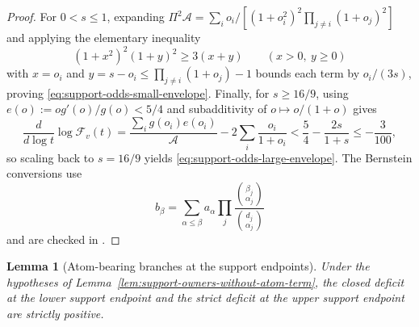 \documentclass[11pt]{article}
\numberwithin{equation}{section}
\newtheorem{lemma}[theorem]{Lemma}
\theoremstyle{definition}
\theoremstyle{remark}
\begin{document}
\begin{proof}
For $0<s\le1$, expanding $\Pi^2\mathcal A=\sum_i o_i/[(1+o_i^2)^2\prod_{j\ne i}(1+o_j)^2]$
and applying the elementary inequality
\begin{equation}
 (1+x^2)^2(1+y)^2\geq3(x+y)
 \qquad(x>0,\ y\geq0)
\label{eq:support-odds-termwise-denominator}
\end{equation}
with $x=o_i$ and $y=s-o_i\le\prod_{j\ne i}(1+o_j)-1$ bounds each term by
$o_i/(3s)$, proving \eqref{eq:support-odds-small-envelope}. Finally, for
$s\ge16/9$, using $e(o):=og'(o)/g(o)<5/4$ and subadditivity of $o\mapsto o/(1+o)$
gives
\[
 \frac{d}{d\log t}\log\mathcal F_v(t)
 =\frac{\sum_i g(o_i)e(o_i)}{\mathcal A}-2\sum_i\frac{o_i}{1+o_i}
 <\frac54-\frac{2s}{1+s}\leq-\frac3{100},
\]
so scaling back to $s=16/9$ yields \eqref{eq:support-odds-large-envelope}. The
Bernstein conversions use
\begin{equation}\label{eq:bernstein-conversion}
 b_\beta=\sum_{\alpha\le\beta}a_\alpha\prod_j
 \frac{\binom{\beta_j}{\alpha_j}}{\binom{d_j}{\alpha_j}}
\end{equation}
and are checked in .
\end{proof}

\begin{samepage}
\begin{lemma}[Atom-bearing branches at the support endpoints]
\label{lem:atom-bearing-support-owners}
Under the hypotheses of Lemma~\ref{lem:support-owners-without-atom-term}, the
closed deficit at the lower support endpoint and the strict deficit at the
upper support endpoint are strictly positive.
\end{lemma}
\end{samepage}
\end{document}
